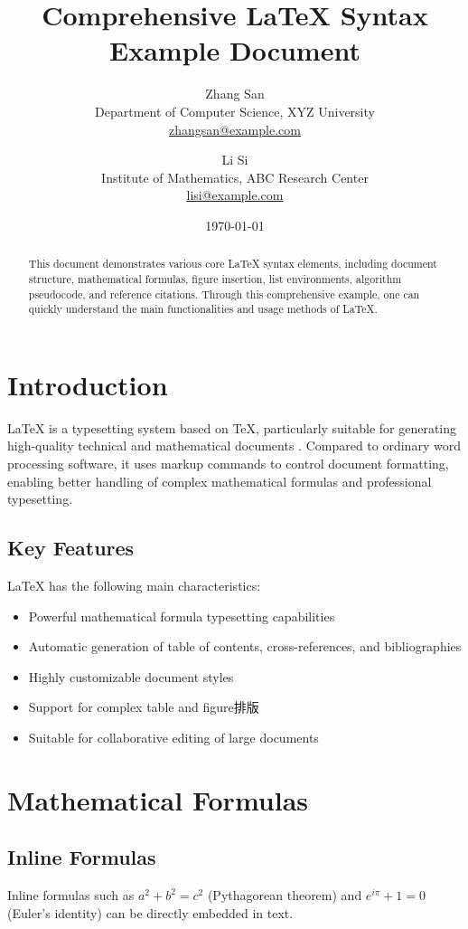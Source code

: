 \documentclass[12pt,a4paper]{article}
\title{Comprehensive LaTeX Syntax Example Document}
\author{
    Zhang San \\
    \small Department of Computer Science, XYZ University \\
    \small \href{mailto:zhangsan@example.com}{zhangsan@example.com}
    \and
    Li Si \\
    \small Institute of Mathematics, ABC Research Center \\
    \small \href{mailto:lisi@example.com}{lisi@example.com}
}
\date{\today}
\begin{document}
\maketitle

\begin{abstract}
This document demonstrates various core LaTeX syntax elements, including document structure, mathematical formulas, figure insertion, list environments, algorithm pseudocode, and reference citations. Through this comprehensive example, one can quickly understand the main functionalities and usage methods of LaTeX.
\end{abstract}

\section{Introduction}
\label{sec:introduction}

LaTeX is a typesetting system based on TeX, particularly suitable for generating high-quality technical and mathematical documents \cite{lamport1994latex}. Compared to ordinary word processing software, it uses markup commands to control document formatting, enabling better handling of complex mathematical formulas and professional typesetting.

\subsection{Key Features}
LaTeX has the following main characteristics:
\begin{itemize}
    \item Powerful mathematical formula typesetting capabilities
    \item Automatic generation of table of contents, cross-references, and bibliographies
    \item Highly customizable document styles
    \item Support for complex table and figure排版
    \item Suitable for collaborative editing of large documents
\end{itemize}

\section{Mathematical Formulas}
\label{sec:math}

\subsection{Inline Formulas}
Inline formulas such as $a^2 + b^2 = c^2$ (Pythagorean theorem) and $e^{i\pi} + 1 = 0$ (Euler's identity) can be directly embedded in text.
\end{document}
